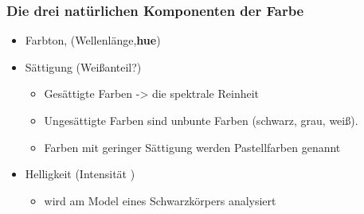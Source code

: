 \documentclass{beamer}
\begin{document}

\begin{frame}[t]\frametitle{Die drei natürlichen Komponenten der Farbe}
  
\begin{itemize}
      \item Farbton, (Wellenlänge,\textbf{hue}) %
   \item Sättigung (Weißanteil?) 
   \begin{itemize}
   \item Gesättigte Farben -> die spektrale Reinheit 
   \item Ungesättigte Farben sind unbunte Farben (schwarz, grau, weiß).
   \item Farben mit geringer Sättigung werden Pastellfarben genannt
   \end{itemize}


      \item Helligkeit (Intensität ) %
      \begin{itemize}
        \item  wird am Model eines Schwarzkörpers analysiert
      \end{itemize}
      
   \end{itemize}


 \end{frame}
\end{document}
